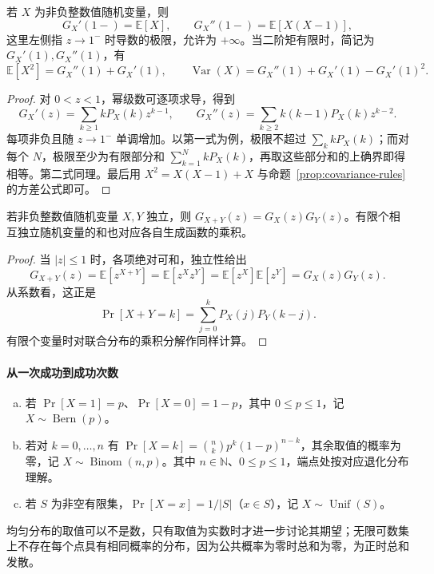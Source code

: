 \documentclass[lang=cn,a4paper,fontset=none,zihao=false,10pt,openany,twoside]{beautybook}
\numberwithin{algorithm}{chapter}
\newcommand{\N}{\mathbb N}
\begin{document}
\begin{proposition}[由生成函数读取矩]\label{prop:pgf-moments}
若 $X$ 为非负整数值随机变量，则
\[
 G_X'(1-)=\mathbb E[X],\qquad G_X''(1-)=\mathbb E[X(X-1)],
\]
这里左侧指 $z\to1^-$ 时导数的极限，允许为 $+\infty$。当二阶矩有限时，简记为 $G_X'(1),G_X''(1)$，有
\[
 \mathbb E[X^2]=G_X''(1)+G_X'(1),\qquad
 \operatorname{Var}(X)=G_X''(1)+G_X'(1)-G_X'(1)^2.
\]
\end{proposition}
\begin{proof}
对 $0<z<1$，幂级数可逐项求导，得到
\[
 G_X'(z)=\sum_{k\ge1}kP_X(k)z^{k-1},\qquad
 G_X''(z)=\sum_{k\ge2}k(k-1)P_X(k)z^{k-2}.
\]
每项非负且随 $z\to1^-$ 单调增加。以第一式为例，极限不超过 $\sum_k kP_X(k)$；而对每个 $N$，极限至少为有限部分和 $\sum_{k=1}^N kP_X(k)$，再取这些部分和的上确界即得相等。第二式同理。最后用 $X^2=X(X-1)+X$ 与命题~\ref{prop:covariance-rules} 的方差公式即可。
\end{proof}

\begin{proposition}[独立和的生成函数]\label{prop:pgf-independent-sum}
若非负整数值随机变量 $X,Y$ 独立，则 $G_{X+Y}(z)=G_X(z)G_Y(z)$。有限个相互独立随机变量的和也对应各自生成函数的乘积。
\end{proposition}
\begin{proof}
当 $|z|\le1$ 时，各项绝对可和，独立性给出
\[
 G_{X+Y}(z)=\mathbb E[z^{X+Y}]=\mathbb E[z^Xz^Y]
 =\mathbb E[z^X]\mathbb E[z^Y]=G_X(z)G_Y(z).
\]
从系数看，这正是
\[
 \Pr[X+Y=k]=\sum_{j=0}^kP_X(j)P_Y(k-j).
\]
有限个变量时对联合分布的乘积分解作同样计算。
\end{proof}

\paragraph{从一次成功到成功次数}
\begin{definition}\label{def:bernoulli-binomial-uniform}
\begin{enumerate}[(a)]
\item 若 $\Pr[X=1]=p$、$\Pr[X=0]=1-p$，其中 $0\le p\le1$，记 $X\sim\operatorname{Bern}(p)$。
\item 若对 $k=0,\ldots,n$ 有 $\Pr[X=k]=\binom nkp^k(1-p)^{n-k}$，其余取值的概率为零，记 $X\sim\operatorname{Binom}(n,p)$。其中 $n\in\N$、$0\le p\le1$，端点处按对应退化分布理解。
\item 若 $S$ 为非空有限集，$\Pr[X=x]=1/|S|$（$x\in S$），记 $X\sim\operatorname{Unif}(S)$。
\end{enumerate}
\end{definition}
均匀分布的取值可以不是数，只有取值为实数时才进一步讨论其期望；无限可数集上不存在每个点具有相同概率的分布，因为公共概率为零时总和为零，为正时总和发散。
\end{document}
